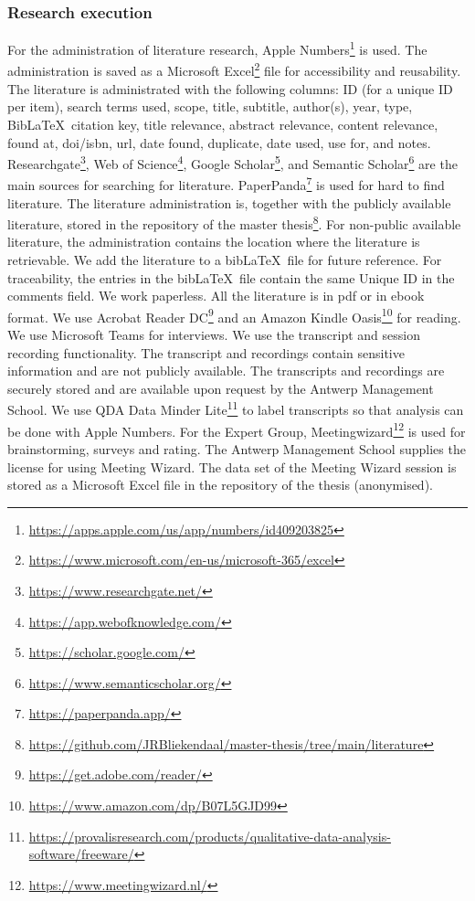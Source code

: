 \subsubsection{Research execution}
\label{subsub:tbresearchexecution}
For the administration of literature research, Apple Numbers\footnote{\url{https://apps.apple.com/us/app/numbers/id409203825}} is used. The administration is saved as a Microsoft Excel\footnote{\url{https://www.microsoft.com/en-us/microsoft-365/excel}} file for accessibility and reusability. The literature is administrated with the following columns: ID (for a unique ID per item), search terms used, scope, title, subtitle, author(s), year, type, Bib\LaTeX\ citation key, title relevance, abstract relevance, content relevance, found at, doi/isbn, url, date found, duplicate, date used, use for, and notes. Researchgate\footnote{\url{https://www.researchgate.net/}}, Web of Science\footnote{\url{https://app.webofknowledge.com/}}, Google Scholar\footnote{\url{https://scholar.google.com/}}, and Semantic Scholar\footnote{\url{https://www.semanticscholar.org/}} are the main sources for searching for literature. PaperPanda\footnote{\url{https://paperpanda.app/}} is used for hard to find literature. The literature administration is, together with the publicly available literature, stored in the repository of the master thesis\footnote{\url{https://github.com/JRBliekendaal/master-thesis/tree/main/literature}}. For non-public available literature, the administration contains the location where the literature is retrievable. We add the literature to a bib\LaTeX\ file for future reference. For traceability, the entries in the bib\LaTeX\ file contain the same Unique ID in the comments field. We work paperless. All the literature is in pdf or in ebook format. We use Acrobat Reader DC\footnote{\url{https://get.adobe.com/reader/}} and an Amazon Kindle Oasis\footnote{\url{https://www.amazon.com/dp/B07L5GJD99}} for reading. We use Microsoft Teams for interviews. We use the transcript and session recording functionality. The transcript and recordings contain sensitive information and are not publicly available. The transcripts and recordings are securely stored and are available upon request by the Antwerp Management School. We use QDA Data Minder Lite\footnote{\url{https://provalisresearch.com/products/qualitative-data-analysis-software/freeware/}} to label transcripts so that analysis can be done with Apple Numbers. For the Expert Group, Meetingwizard\footnote{\url{https://www.meetingwizard.nl/}} is used for brainstorming, surveys and rating. The Antwerp Management School supplies the license for using Meeting Wizard. The data set of the Meeting Wizard session is stored as a Microsoft Excel file in the repository of the thesis (anonymised).

